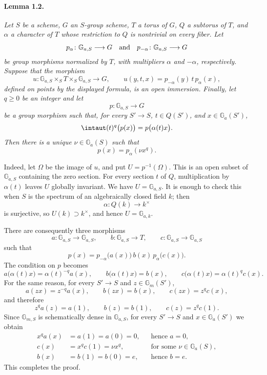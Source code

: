 \paragraph{\textbf{Lemma 1.2.}}
\emph{Let \(S\) be a scheme, \(G\) an \(S\)-group scheme, \(T\) a
torus of \(G\), \(Q\) a subtorus of \(T\), and \(\alpha\) a
character of \(T\) whose restriction to \(Q\) is nontrivial on every
fiber. Let
\[
  p_\alpha\colon\mathbb G_{a,S}\longrightarrow G
  \quad\textup{and}\quad
  p_{-\alpha}\colon\mathbb G_{a,S}\longrightarrow G
\]
be group morphisms normalized by \(T\), with multipliers \(\alpha\)
and \(-\alpha\), respectively. Suppose that the morphism
\[
  u\colon\mathbb G_{a,S}\times_S T\times_S\mathbb G_{a,S}
    \longrightarrow G,
  \qquad
  u(y,t,x)=p_{-\alpha}(y)\,t\,p_\alpha(x),
\]
defined on points by the displayed formula, is an open immersion.
Finally, let \(q\geq 0\) be an integer and let
\[
  p\colon\mathbb G_{a,S}\longrightarrow G
\]
be a group morphism such that, for every \(S'\to S\),
\(t\in Q(S')\), and \(x\in\mathbb G_a(S')\),
\[
  \intaut(t)^q\bigl(p(x)\bigr)=p\bigl(\alpha(t)x\bigr).
\]
Then there is a unique \(\nu\in\mathbb G_a(S)\) such that
\[
  p(x)=p_\alpha(\nu x^q).
\]}

Indeed, let \(\Omega\) be the image of \(u\), and put
\(U=p^{-1}(\Omega)\). This is an open subset of
\(\mathbb G_{a,S}\) containing the zero section. For every section
\(t\) of \(Q\), multiplication by \(\alpha(t)\) leaves \(U\)
globally invariant. We have \(U=\mathbb G_{a,S}\). It is enough to
check this when \(S\) is the spectrum of an algebraically closed
field \(k\); then
\[
  \alpha\colon Q(k)\longrightarrow k^\times
\]
is surjective, so \(U(k)\supset k^\times\), and hence
\(U=\mathbb G_{a,k}\).

There are consequently three morphisms
\[
  a\colon\mathbb G_{a,S}\longrightarrow\mathbb G_{a,S},
  \qquad
  b\colon\mathbb G_{a,S}\longrightarrow T,
  \qquad
  c\colon\mathbb G_{a,S}\longrightarrow\mathbb G_{a,S}
\]
such that
\[
  p(x)=p_{-\alpha}\bigl(a(x)\bigr)\,b(x)\,
       p_\alpha\bigl(c(x)\bigr).
\]
The condition on \(p\) becomes
\[
  a\bigl(\alpha(t)x\bigr)=\alpha(t)^{-q}a(x),\qquad
  b\bigl(\alpha(t)x\bigr)=b(x),\qquad
  c\bigl(\alpha(t)x\bigr)=\alpha(t)^q c(x).
\]
For the same reason, for every \(S'\to S\) and
\(z\in\mathbb G_m(S')\),
\[
  a(zx)=z^{-q}a(x),\qquad b(zx)=b(x),\qquad c(zx)=z^q c(x),
\]
and therefore
\[
  z^q a(z)=a(1),\qquad b(z)=b(1),\qquad c(z)=z^q c(1).
\]
Since \(\mathbb G_{m,S}\) is schematically dense in
\(\mathbb G_{a,S}\), for every \(S'\to S\) and
\(x\in\mathbb G_a(S')\) we obtain
\[
\begin{aligned}
  x^q a(x)&=a(1)=a(0)=0, &&\text{hence }a=0,\\
  c(x)&=x^q c(1)=\nu x^q,
    &&\text{for some }\nu\in\mathbb G_a(S),\\
  b(x)&=b(1)=b(0)=e, &&\text{hence }b=e.
\end{aligned}
\]
This completes the proof.

